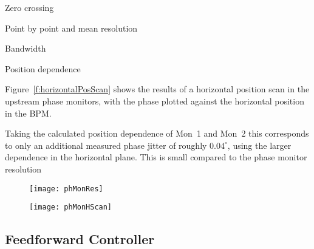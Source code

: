 Zero crossing

Point by point and mean resolution

Bandwidth

Position dependence

Figure~\ref{f:horizontalPosScan} shows the results of a horizontal position 
scan in the upstream phase monitors, with the phase plotted against the 
horizontal position in the BPM.

Taking the calculated position dependence of Mon~1 and Mon~2 this corresponds 
to only an additional measured phase jitter of roughly \(0.04^\circ\), using 
the larger dependence in the horizontal plane. This is small compared to the 
phase monitor resolution



\begin{figure}
  \centering
  \texttt{[image: phMonRes]}%
  \caption{\label{f:phMonRes}
  }
\end{figure}


\begin{figure}
  \centering
  \texttt{[image: phMonHScan]}%
  \caption{\label{f:phMonHScan}
  }
\end{figure}

\subsection{\label{ss:font}Feedforward Controller}

